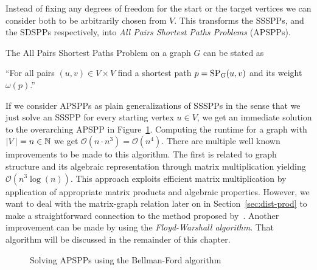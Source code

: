 Instead of fixing any degrees of freedom for the start or the target vertices we can consider both to be arbitrarily chosen from $V$.
This transforms the SSSPPs, and the SDSPPs respectively, into \emph{All Pairs Shortest Paths Problems} (APSPPs).

\begin{definition}
    The All Pairs Shortest Paths Problem on a graph $G$ can be stated as
    \begin{displayquote}
        ``For all pairs $(u, v) \in V \times V$ find a shortest path $p = \operatorname{SP}_G(u, v)$ and its weight $\omega(p)$.''
    \end{displayquote}
\end{definition}

If we consider APSPPs as plain generalizations of SSSPPs in the sense that we just solve an SSSPP for every starting vertex $u \in V$, we get an immediate solution to the overarching APSPP in Figure~\ref{alg:bellman-ford-apsp}.
Computing the runtime for a graph with $\left\lvert V\right\rvert_{} = n \in \mathbb{N}$ we get $\mathcal{O}\left( n \cdot n^3 \right) = \mathcal{O}\left( n^4 \right)$.
There are multiple well known improvements to be made to this algorithm.
The first is related to graph structure and its algebraic representation through matrix multiplication yielding $\mathcal{O}\left( n^3 \log(n) \right)$.
This approach exploits efficient matrix multiplication by application of appropriate matrix products and algebraic properties.
However, we want to deal with the matrix-graph relation later on in Section~\ref{sec:dist-prod} to make a straightforward connection to the method proposed by~\cite{Chan2007}.
Another improvement can be made by using the \emph{Floyd-Warshall algorithm}.
That algorithm will be discussed in the remainder of this chapter.

\begin{figure}[ht]
    \centering
    \begin{minipage}{.5\textwidth}
        \begin{algorithm}[H]
        \end{algorithm}
    \end{minipage}
    \caption{Solving APSPPs using the Bellman-Ford algorithm\label{alg:bellman-ford-apsp}}
\end{figure}

